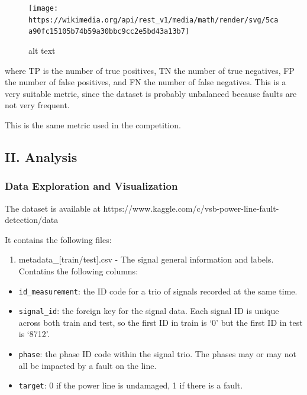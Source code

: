 \documentclass[11pt]{article}
\providecommand{\tightlist}{%
      \setlength{\itemsep}{0pt}\setlength{\parskip}{0pt}}
\begin{document}
\begin{figure}
\centering
\texttt{[image: https://wikimedia.org/api/rest\_v1/media/math/render/svg/5caa90fc15105b74b59a30bbc9cc2e5bd43a13b7]}
\caption{alt text}
\end{figure}

where TP is the number of true positives, TN the number of true
negatives, FP the number of false positives, and FN the number of false
negatives. This is a very suitable metric, since the dataset is probably
unbalanced because faults are not very frequent.

This is the same metric used in the competition.

    \hypertarget{ii.-analysis}{%
\subsection{II. Analysis}\label{ii.-analysis}}

\hypertarget{data-exploration-and-visualization}{%
\subsubsection{Data Exploration and
Visualization}\label{data-exploration-and-visualization}}

The dataset is available at
https://www.kaggle.com/c/vsb-power-line-fault-detection/data

It contains the following files:

\begin{enumerate}
\def\labelenumi{\alph{enumi})}
\tightlist
\item
  metadata\_{[}train/test{]}.csv - The signal general information and
  labels. Contatins the following columns:
\end{enumerate}

\begin{itemize}
\item
  \texttt{id\_measurement}: the ID code for a trio of signals recorded
  at the same time.
\item
  \texttt{signal\_id}: the foreign key for the signal data. Each signal
  ID is unique across both train and test, so the first ID in train is
  `0' but the first ID in test is `8712'.
\item
  \texttt{phase}: the phase ID code within the signal trio. The phases
  may or may not all be impacted by a fault on the line.
\item
  \texttt{target}: 0 if the power line is undamaged, 1 if there is a
  fault.
\end{itemize}
\end{document}
